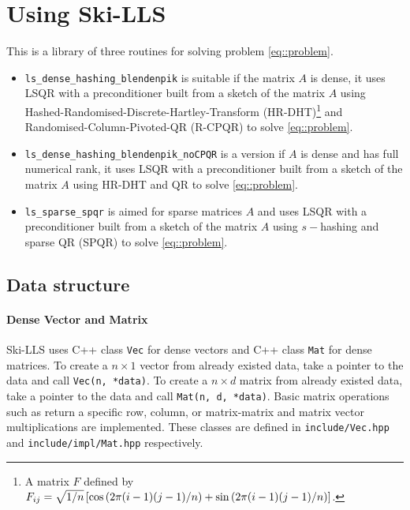 \documentclass[english,11pt]{article}
\begin{document}
\section{Using Ski-LLS}

This is a library of three routines for solving problem \eqref{eq::problem}. 

\begin{itemize}
	\item {\tt ls_dense_hashing_blendenpik} is suitable if the matrix $A$ is dense, it uses LSQR \cite{Paige:1982aa} with a preconditioner built from a sketch of the matrix $A$ using Hashed-Randomised-Discrete-Hartley-Transform (HR-DHT)\footnote{A matrix $F$ defined by $F_{ij} = \sqrt{1/n} \left[  \cos{ \left(  2\pi (i-1)(j-1)/n\right)} + \sin{ \left( 2 \pi (i-1)(j-1)/n\right)} \right]$.} and Randomised-Column-Pivoted-QR (R-CPQR) \cite{Martinsson:2017eh} to solve \eqref{eq::problem}.

	\item {\tt ls_dense_hashing_blendenpik_noCPQR} is a version if $A$ is dense and has full numerical rank, it uses LSQR with a preconditioner built from a sketch of the matrix $A$ using HR-DHT and QR to solve \eqref{eq::problem}.

	\item {\tt ls_sparse_spqr} is aimed for sparse matrices $A$ and uses LSQR with a preconditioner built from a sketch of the matrix $A$ using $s-$hashing and sparse QR (SPQR) \cite{Davis:2011ft} to solve \eqref{eq::problem}.
\end{itemize}

\subsection{Data structure}

\paragraph{Dense Vector and Matrix}
Ski-LLS uses C++ class {\tt Vec} for dense vectors and C++ class {\tt Mat} for dense matrices. 
To create a $n\times 1$ vector from already existed data, take a pointer to the data and call {\tt Vec(n, *data)}. 
To create a $n \times d$ matrix from already existed data, take a pointer to the data and call {\tt Mat(n, d, *data)}. Basic matrix operations such as return a specific row, column, or matrix-matrix and matrix vector multiplications are implemented.  
These classes are defined in {\tt include/Vec.hpp} and {\tt include/impl/Mat.hpp} respectively. 
\end{document}
